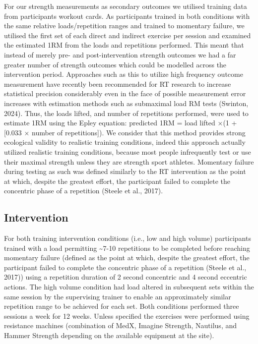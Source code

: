 \documentclass[
]{article}
\begin{document}
For our strength measurements as secondary outcomes we utilised training
data from participants workout cards. As participants trained in both
conditions with the same relative loads/repetition ranges and trained to
momentary failure, we utilised the first set of each direct and indirect
exercise per session and examined the estimated 1RM from the loads and
repetitions performed. This meant that instead of merely pre- and
post-intervention strength outcomes we had a far greater number of
strength outcomes which could be modelled across the intervention
period. Approaches such as this to utilize high frequency outcome
measurement have recently been recommended for RT research to increase
statistical precision considerably even in the face of possible
measurement error increases with estimation methods such as submaximal
load RM tests (Swinton, 2024). Thus, the loads lifted, and number of
repetitions performed, were used to estimate 1RM using the Epley
equation: predicted 1RM = load lifted ×(1 + {[}0.033 × number of
repetitions{]}). We consider that this method provides strong ecological
validity to realistic training conditions, indeed this approach actually
utilized realistic training conditions, because most people infrequently
test or use their maximal strength unless they are strength sport
athletes. Momentary failure during testing as such was defined similarly
to the RT intervention as the point at which, despite the greatest
effort, the participant failed to complete the concentric phase of a
repetition (Steele et al., 2017).

\subsection{Intervention}\label{intervention}

For both training intervention conditions (i.e., low and high volume)
participants trained with a load permitting \textasciitilde7-10
repetitions to be completed before reaching momentary failure (defined
as the point at which, despite the greatest effort, the participant
failed to complete the concentric phase of a repetition (Steele et al.,
2017)) using a repetition duration of 2 second concentric and 4 second
eccentric actions. The high volume condition had load altered in
subsequent sets within the same session by the supervising trainer to
enable an approximately similar repetition range to be achieved for each
set. Both conditions performed three sessions a week for 12 weeks.
Unless specified the exercises were performed using resistance machines
(combination of MedX, Imagine Strength, Nautilus, and Hammer Strength
depending on the available equipment at the site).
\end{document}
